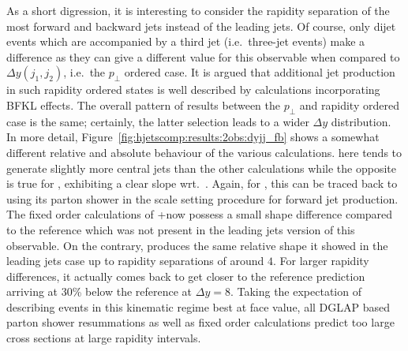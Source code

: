 As a short digression, it is interesting to consider the rapidity 
separation of the most forward and backward jets instead of the 
leading jets. Of course, only dijet events which are accompanied by 
a third jet (i.e.~three-jet events) make a difference as they can give
a different value for this observable when compared to $\Delta
y(j_1,j_2)$, i.e.~the $p_\perp$ ordered case. It is argued that
additional jet production in such rapidity ordered states is well
described by calculations incorporating BFKL effects.
The overall pattern of results between the $p_\perp$ and rapidity
ordered case is the same; certainly, the latter selection leads to a
wider $\Delta y$ distribution. In more detail,
Figure~\ref{fig:hjetscomp:results:2obs:dyjj_fb} shows a somewhat
different relative and absolute behaviour of the various calculations.
\Powheg \NNLOPS here tends to generate slightly more 
central jets than the other calculations while the opposite is true 
for \Sherpa \MEPSatNLO, exhibiting a clear slope wrt.~\Powheg. Again,
for \Sherpa \MEPSatNLO, this can be traced back to using its parton
shower in the scale setting procedure for forward jet production. 
The fixed order calculations of \GoSam{}+\Sherpa now possess a small
shape difference compared to the \Powheg reference which was not
present in the leading jets version of this observable. On the
contrary, \Hej produces the same relative shape it showed in the 
leading jets case up to rapidity separations of around $4$. For
larger rapidity differences, it actually comes back to get closer to
the reference prediction arriving at 30\% below the reference at
$\Delta y=8$. Taking the expectation of \Hej describing events in 
this kinematic regime best at face value, all DGLAP based parton shower 
resummations as well as fixed order calculations predict too large 
cross sections at large rapidity intervals.

